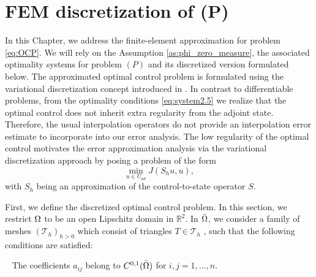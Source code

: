 \chapter{FEM discretization of (P)}\label{s:fem_analysis}
In this Chapter, we address the finite-element approximation for problem \eqref{eq:OCP}. 
We will rely on the Assumption \ref{as:phi_zero_measure}, the associated optimality systems for 
problem $(P)$ and its discretized version formulated below. The approximated optimal control problem
 is formulated using the variational discretization concept introduced in \cite{hinze05}. 
 In contrast to differentiable problems, from the optimality conditions \eqref{eq:system2.5} we 
 realize that the optimal control does not inherit extra regularity from the adjoint state. 
 Therefore, the usual interpolation operators do not provide an interpolation error estimate to 
 incorporate into our error analysis. The low regularity of the optimal control motivates the error
  approximation analysis via the variational discretization approach by posing a problem of the form
 $$\min_{u\in U_{ad}} J(S_h u,u),$$
 with $S_h$ being an approximation of the control-to-state operator $S$.
 
First, we define the discretized optimal control problem. In this section, we restrict $\Omega$ to be an open Lipschitz domain in $\mathbb{R}^{2}$. In $\bar{\Omega}$, we consider a family of meshes $(\mathcal{T}_h)_{h>0}$ which consist  of triangles $T\in\mathcal{T}_h$ ,  such that the following conditions are satisfied:

\begin{assumption}\label{assupmtion_h2}
~
The coefficients $a_{ij}$ belong to $C^{0,1}(\bar {\Omega})$ for $i,j = 1,\ldots,n$.
\end{assumption}


